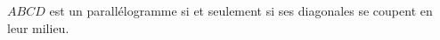 $ABCD$ est un parallélogramme si et seulement si ses diagonales se coupent en leur milieu.

\begin{reponses}
\end{reponses}

